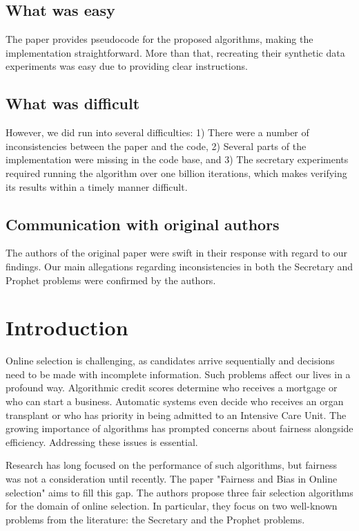 \subsection*{What was easy}

The paper provides pseudocode for the proposed algorithms, making the implementation straightforward. More than that, recreating their synthetic data experiments was easy due to providing clear instructions.

\subsection*{What was difficult}
However, we did run into several difficulties: 1) There were a number of inconsistencies between the paper and the code, 2) Several parts of the implementation were missing in the code base, and 3) The secretary experiments required running the algorithm over one billion iterations, which makes verifying its results within a timely manner difficult.

\subsection*{Communication with original authors}
The authors of the original paper were swift in their response with regard to our findings. Our main allegations regarding inconsistencies in both the Secretary and Prophet problems were confirmed by the authors. 


\section{Introduction}

Online selection is challenging, as candidates arrive sequentially and decisions need to be made with incomplete information. Such problems affect our lives in a profound way. Algorithmic credit scores determine who receives a mortgage or who can start a business. Automatic systems even decide who receives an organ transplant or who has priority in being admitted to an Intensive Care Unit. The growing importance of algorithms has prompted concerns about fairness alongside efficiency. Addressing these issues is essential.

 Research has long focused on the performance of such algorithms, but fairness was not a consideration until recently.\citet{buchbinder2014secretary,Cayci2020} The paper "Fairness and Bias in Online selection" \citet{correa21} aims to fill this gap. The authors propose three fair selection algorithms for the  domain of online selection. In particular, they focus on two well-known problems from the literature: the Secretary and the Prophet problems.



